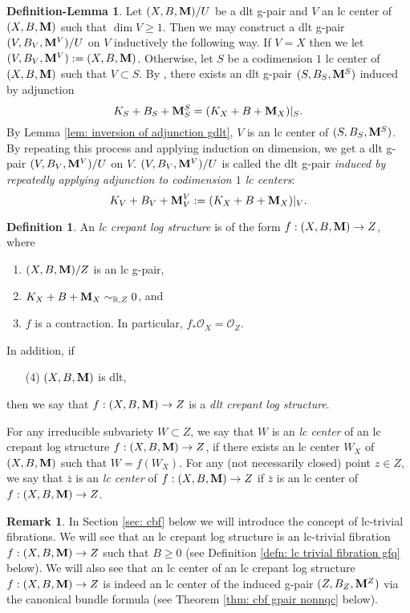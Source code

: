 \documentclass[11pt]{amsart}
\numberwithin{equation}{section}
\newcommand{\Mm}{{\bf{M}}}
\newcommand{\Rr}{\mathbb{R}}
\newcommand{\Oo}{\mathcal{O}}
\theoremstyle{definition}
\newtheorem{defn}[thm]{Definition}
\theoremstyle{definition}
\newtheorem{rem}[thm]{Remark}
\newtheorem{deflem}[thm]{Definition-Lemma}
\theoremstyle{definition}
\begin{document}
\begin{deflem}
    Let $(X,B,\Mm)/U$ be a dlt g-pair and $V$ an lc center of $(X,B,\Mm)$ such that $\dim V\geq 1$. Then we may construct a dlt g-pair $(V,B_V,\Mm^V)/U$ on $V$ inductively the following way. If $V=X$ then we let $(V,B_V,\Mm^V):=(X,B,\Mm)$. Otherwise, let $S$ be a codimension $1$ lc center of $(X,B,\Mm)$ such that $V\subset S$. By \cite[Lemma 2.9]{HL22}, there exists an dlt g-pair $(S,B_{S},\Mm^S)$ induced by adjunction
    $$K_{S}+B_{S}+\Mm^S_{S}=(K_X+B+\Mm_X)|_{S}.$$
    By Lemma \ref{lem: inversion of adjunction gdlt}, $V$ is an lc center of $(S,B_S,\Mm^S)$. By repeating this process and applying induction on dimension, we get a dlt g-pair $(V,B_V,\Mm^V)/U$ on $V$. $(V,B_V,\Mm^V)/U$ is called the dlt g-pair \emph{induced by repeatedly applying adjunction to codimension $1$ lc centers}:
    $$K_V+B_V+\Mm^V_V:=(K_X+B+\Mm_X)|_V.$$
\end{deflem}

\begin{defn}\label{defn: lc cls}
An \emph{lc crepant log structure} is of the form $f: (X,B,\Mm)\rightarrow Z$, where
\begin{enumerate}
    \item $(X,B,\Mm)/Z$ is an lc g-pair,
    \item $K_X+B+\Mm_X\sim_{\Rr,Z}0$, and
    \item $f$ is a contraction. In particular, $f_*\Oo_X=\Oo_Z$.
\end{enumerate}
In addition, if
\begin{enumerate}
    \item[(4)] $(X,B,\Mm)$ is dlt, 
\end{enumerate}
then we say that $f: (X,B,\Mm)\rightarrow Z$ is a \emph{dlt crepant log structure}. 

For any irreducible subvariety $W\subset Z$, we say that $W$ is an \emph{lc center} of an lc crepant log structure $f: (X,B,\Mm)\rightarrow Z$, if there exists an lc center $W_X$ of $(X,B,\Mm)$ such that $W=f(W_X)$. For any (not necessarily closed) point $z\in Z$, we say that $\bar z$ is an \emph{lc center} of $f: (X,B,\Mm)\rightarrow Z$ if $\bar z$ is an lc center of $f: (X,B,\Mm)\rightarrow Z$.
\end{defn}

\begin{rem} 
In Section \ref{sec: cbf} below we will introduce the concept of lc-trivial fibrations. We will see that an lc crepant log structure is an lc-trivial fibration $f: (X,B,\Mm)\rightarrow Z$ such that $B\geq 0$ (see Definition \ref{defn: lc trivial fibration gfq} below). We will also see that an lc center of an lc crepant log structure $f: (X,B,\Mm)\rightarrow Z$ is indeed an lc center of the induced g-pair $(Z,B_Z,\Mm^Z)$ via the canonical bundle formula (see Theorem \ref{thm: cbf gpair nonnqc} below).
\end{rem}
\end{document}
